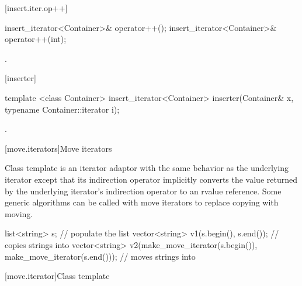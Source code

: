 [insert.iter.op++]{}

%
\begin{itemdecl}
insert_iterator<Container>& operator++();
insert_iterator<Container>& operator++(int);
\end{itemdecl}

\begin{itemdescr}
\pnum
\returns
{}.
\end{itemdescr}

[inserter]{}

%
\begin{itemdecl}
template <class Container>
  insert_iterator<Container> inserter(Container& x, typename Container::iterator i);
\end{itemdecl}

\begin{itemdescr}
\pnum
\returns
{}.
\end{itemdescr}

[move.iterators]{Move iterators}

\pnum
Class template  is an iterator adaptor
with the same behavior as the underlying iterator except that its
indirection operator implicitly converts the value returned by the
underlying iterator's indirection operator to an rvalue reference.
Some generic algorithms can be called with move iterators to replace
copying with moving. 

\pnum
\enterexample

\begin{codeblock}
list<string> s;
// populate the list 
vector<string> v1(s.begin(), s.end());          // copies strings into 
vector<string> v2(make_move_iterator(s.begin()),
                  make_move_iterator(s.end())); // moves strings into 
\end{codeblock}

\exitexample

[move.iterator]{Class template }

